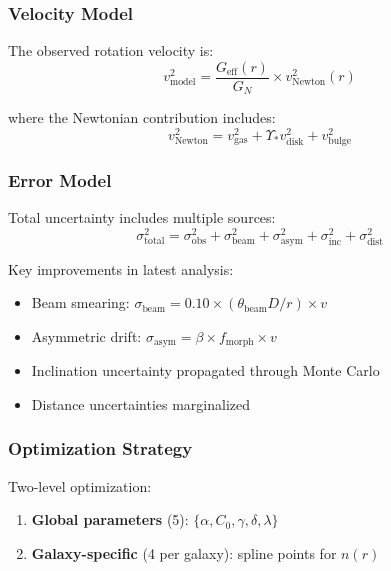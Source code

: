 \documentclass[12pt,letterpaper]{article}
\newcommand{\geff}{G_{\text{eff}}}
\newcommand{\gnewton}{G_N}
\begin{document}
\subsubsection{Velocity Model}

The observed rotation velocity is:
\begin{equation}
v_{\text{model}}^2 = \frac{\geff(r)}{\gnewton} \times v_{\text{Newton}}^2(r)
\end{equation}

where the Newtonian contribution includes:
\begin{equation}
v_{\text{Newton}}^2 = v_{\text{gas}}^2 + \Upsilon_* v_{\text{disk}}^2 + v_{\text{bulge}}^2
\end{equation}

\subsubsection{Error Model}

Total uncertainty includes multiple sources:
\begin{equation}
\sigma_{\text{total}}^2 = \sigma_{\text{obs}}^2 + \sigma_{\text{beam}}^2 + \sigma_{\text{asym}}^2 + \sigma_{\text{inc}}^2 + \sigma_{\text{dist}}^2
\end{equation}

Key improvements in latest analysis:
\begin{itemize}
    \item Beam smearing: $\sigma_{\text{beam}} = 0.10 \times (\theta_{\text{beam}} D/r) \times v$
    \item Asymmetric drift: $\sigma_{\text{asym}} = \beta \times f_{\text{morph}} \times v$
    \item Inclination uncertainty propagated through Monte Carlo
    \item Distance uncertainties marginalized
\end{itemize}

\subsubsection{Optimization Strategy}

Two-level optimization:
\begin{enumerate}
    \item \textbf{Global parameters} (5): $\{\alpha, C_0, \gamma, \delta, \lambda\}$
    \item \textbf{Galaxy-specific} (4 per galaxy): spline points for $n(r)$
\end{enumerate}
\end{document}
